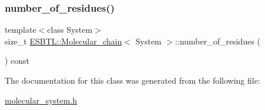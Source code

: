 \subsubsection{\texorpdfstring{number\+\_\+of\+\_\+residues()}{number\_of\_residues()}}
{\footnotesize\ttfamily template$<$class System$>$ \\
size\+\_\+t \hyperlink{classESBTL_1_1Molecular__chain}{E\+S\+B\+T\+L\+::\+Molecular\+\_\+chain}$<$ System $>$\+::number\+\_\+of\+\_\+residues (\begin{DoxyParamCaption}{ }\end{DoxyParamCaption}) const\hspace{0.3cm}{\ttfamily [inline]}}



The documentation for this class was generated from the following file\+:\begin{DoxyCompactItemize}
\item 
\hyperlink{molecular__system_8h}{molecular\+\_\+system.\+h}\end{DoxyCompactItemize}

